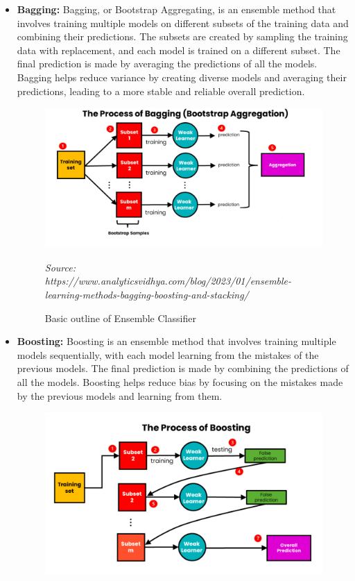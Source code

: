 \begin{itemize}[noitemsep]
    \item \textbf{Bagging:} Bagging, or Bootstrap Aggregating, is an ensemble method that involves training multiple models on different subsets of the training data and combining their predictions. The subsets are created by sampling the training data with replacement, and each model is trained on a different subset. The final prediction is made by averaging the predictions of all the models. Bagging helps reduce variance by creating diverse models and averaging their predictions, leading to a more stable and reliable overall prediction.
    \begin{figure}[H]
        \centering
        \includegraphics[width=120mm]{./img/bagging.jpg}
        \caption*{\small{\textit{Source: https://www.analyticsvidhya.com/blog/2023/01/ensemble-learning-methods-bagging-boosting-and-stacking/}}}
        \caption{Basic outline of Ensemble Classifier}
    \end{figure}
    \item \textbf{Boosting:} Boosting is an ensemble method that involves training multiple models sequentially, with each model learning from the mistakes of the previous models. The final prediction is made by combining the predictions of all the models. Boosting helps reduce bias by focusing on the mistakes made by the previous models and learning from them.
    \begin{figure}[H]
        \centering
        \includegraphics[width=120mm]{./img/boosting.png}

\end{figure}
\end{itemize}
